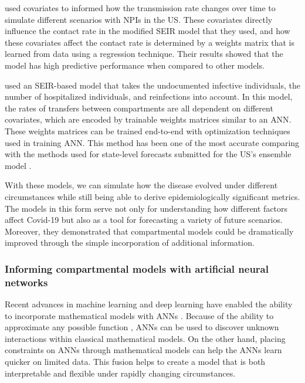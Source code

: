 \citeauthor{ihmecovid-19forecastingteamModelingCOVID19Scenarios2021} \cite{ihmecovid-19forecastingteamModelingCOVID19Scenarios2021} used covariates to informed how the transmission rate changes over time to simulate different scenarios with \glspl{NPI} in the \gls{US}.
These covariates directly influence the contact rate in the modified \gls{SEIR} model that they used, and how these covariates affect the contact rate is determined by a weights matrix that is learned from data using a regression technique.
Their results showed that the model has high predictive performance when compared to other models.

\citeauthor{arikInterpretableSequenceLearning} \cite{arikInterpretableSequenceLearning} used an \gls{SEIR}-based model that takes the undocumented infective individuals, the number of hospitalized individuals, and reinfections into account.
In this model, the rates of transfers between compartments are all dependent on different covariates, which are encoded by trainable weights matrices similar to an \gls{ANN}.
These weights matrices can be trained end-to-end with optimization techniques used in training \gls{ANN}.
This method has been one of the most accurate comparing with the methods used for state-level forecasts submitted for the US’s ensemble model \cite{rayEnsembleForecastsCoronavirus2020}.

With these models, we can simulate how the disease evolved under different circumstances while still being able to derive epidemiologically significant metrics.
The models in this form serve not only for understanding how different factors affect Covid-19 but also as a tool for forecasting a variety of future scenarios.
Moreover, they demonstrated that compartmental models could be dramatically improved through the simple incorporation of additional information.

\subsubsection{Informing compartmental models with artificial neural networks}

Recent advances in machine learning and deep learning have enabled the ability to incorporate mathematical models with \glspl{ANN} \cite{raissiPhysicsinformedNeuralNetworks2019, chenNeuralOrdinaryDifferential2019, rackauckasUniversalDifferentialEquations2020}.
Because of the ability to approximate any possible function \cite{cybenkotApproximationSuperpositionsSigmoidal, hornikApproximationCapabilitiesMultilayer1991, hornikMultilayerFeedforwardNetworks1989}, \glspl{ANN} can be used to discover unknown interactions within classical mathematical models.
On the other hand, placing constraints on \glspl{ANN} through mathematical models can help the \glspl{ANN} learn quicker on limited data.
This fusion helps to create a model that is both interpretable and flexible under rapidly changing circumstances.

